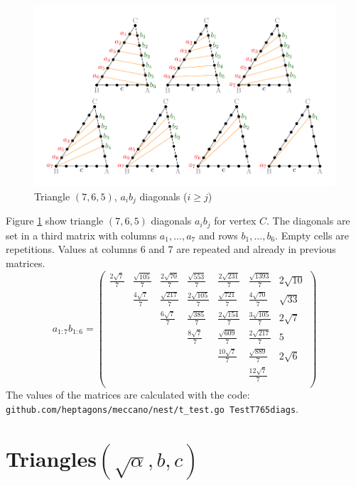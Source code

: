 \documentclass[11pt]{article}
\begin{document}
\begin{figure}[htp]
\centering
\includegraphics[scale=1]{t765ab}
\caption{Triangle $(7,6,5)$, $a_ib_j$ diagonals ($i \ge j$)}
\label{t765ab}
\end{figure}
Figure \ref{t765ab} show triangle $(7,6,5)$ diagonals $a_ib_j$ for vertex $C$.
The diagonals are set in a third matrix with columns $a_1,...,a_7$ and rows $b_1,...,b_6$. Empty cells are repetitions.
Values at columns 6 and 7 are repeated and already in previous matrices.
\begin{equation}\label{eq:appendrow}
a_{1:7}b_{1:6} = \left(\begin{array}{ccccccc}
\frac{2\sqrt{7}}{7} & \frac{\sqrt{105}}{7} & \frac{2\sqrt{70}}{7} & \frac{\sqrt{553}}{7} & \frac{2\sqrt{231}}{7} & \frac{\sqrt{1393}}{7} & 2\sqrt{10} \\
& \frac{4\sqrt{7}}{7} & \frac{\sqrt{217}}{7} & \frac{2\sqrt{105}}{7} & \frac{\sqrt{721}}{7} & \frac{4\sqrt{70}}{7} & \sqrt{33} \\
& & \frac{6\sqrt{7}}{7} & \frac{\sqrt{385}}{7} & \frac{2\sqrt{154}}{7} & \frac{3\sqrt{105}}{7} & 2\sqrt{7} \\
& & & \frac{8\sqrt{7}}{7} & \frac{\sqrt{609}}{7} & \frac{2\sqrt{217}}{7} & 5 \\
& & & & \frac{10\sqrt{7}}{7} & \frac{\sqrt{889}}{7} & 2\sqrt{6} \\
& & & & & \frac{12\sqrt{7}}{7} & \\
\end{array}\right)
\end{equation}
The values of the matrices are calculated with the code:
\texttt{github.com/heptagons/meccano/nest/t\_test.go TestT765diags}.

\section{Triangles$(\sqrt{\alpha},b,c)$}
\end{document}
